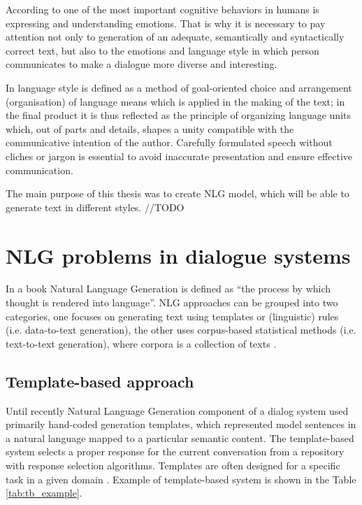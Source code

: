According to \cite{salovey1990emotional} one of the most important cognitive behaviors in humans is expressing and understanding emotions. That is why it is necessary to pay attention not only to generation of an adequate, semantically and syntactically correct text, but also to the emotions and language style in which person communicates to make a dialogue more diverse and interesting. 

In \cite{minavrova2003souvcasna} language style is defined as a method of goal-oriented choice and arrangement (organisation) of language means which is applied in the making of the text; in the final product it is thus reflected as the principle of organizing language units which, out of parts and details, shapes a unity compatible with the communicative intention of the author. Carefully formulated speech without cliches or jargon is essential to avoid inaccurate presentation and ensure effective communication.


The main purpose of this thesis was to create NLG model, which will be able to generate text in different styles.  //TODO


\chapter{NLG problems in dialogue systems}\label{nlg_problems}
In a book \cite{alder2017handbook} Natural Language Generation is defined as ``the process by which thought is rendered into language''. NLG approaches can be grouped into two categories, one focuses on generating text using templates or (linguistic) rules (i.e. data-to-text generation), the other uses corpus-based statistical methods (i.e. text-to-text generation), where corpora is a collection of texts \cite{oh2002stochastic}.

\section{Template-based approach} 
Until recently Natural Language Generation component of a dialog system used primarily hand-coded generation templates, which represented model sentences in a natural language mapped to a particular semantic content.
The template-based system selects a proper response for the current conversation from a repository with response selection algorithms. Templates are often designed for a specific task in a given domain \cite{manishina2016data}. 
Example of template-based system is shown in the Table \ref{tab:tb_example}.

